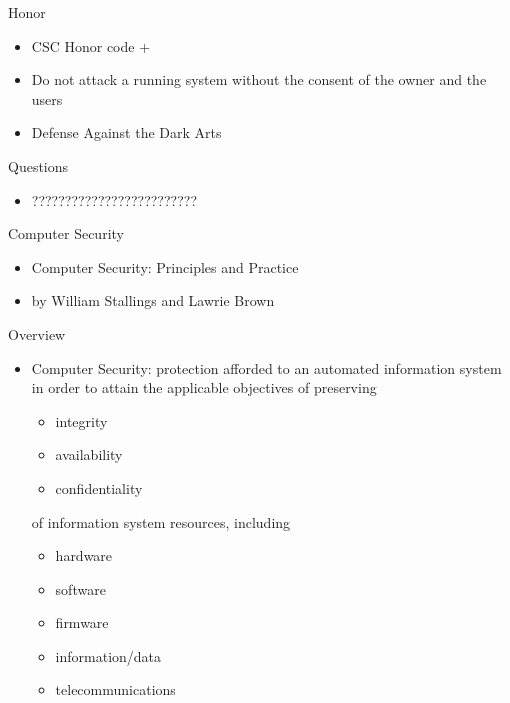 \documentclass{beamer}
\begin{document}
\begin{frame}{Honor}
  \begin{itemize}
  \item CSC Honor code +
  \item \alert{Do not attack a running system 
    without the consent of the owner 
    and the users}
  \item Defense Against the Dark Arts
  \end{itemize}
\end{frame}

\begin{frame}{Questions}
  \begin{itemize}
  \item ?????????????????????????
  \end{itemize}
\end{frame}

\begin{frame}{Computer Security}
  \begin{itemize}
  \item Computer Security: Principles and Practice
  \item by William Stallings and Lawrie Brown
  \end{itemize}
\end{frame}

\begin{frame}{Overview}
  \begin{itemize}
  \item \alert{Computer Security}: protection afforded to an 
    automated information system in order to attain 
    the applicable objectives of preserving
    
    \begin{itemize}
    \item integrity
    \item availability
    \item confidentiality
    \end{itemize}
of  information system resources, including
 
\begin{itemize}
  \item hardware
  \item software
  \item firmware
  \item information/data
  \item telecommunications
\end{itemize}
  \end{itemize}
\end{frame}
\end{document}
